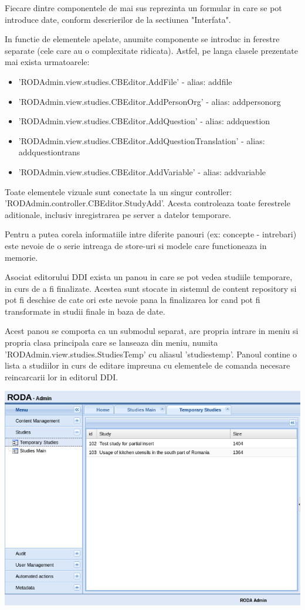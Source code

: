 Fiecare dintre componentele de mai sus reprezinta un formular in care se pot introduce date, conform descrierilor de la sectiunea "Interfata". 

In functie de elementele apelate, anumite componente se introduc in ferestre separate (cele care au o complexitate ridicata). Astfel, pe langa clasele prezentate mai exista urmatoarele: 

\begin{itemize}
\item 'RODAdmin.view.studies.CBEditor.AddFile' - alias: addfile
\item 'RODAdmin.view.studies.CBEditor.AddPersonOrg' - alias: addpersonorg
\item 'RODAdmin.view.studies.CBEditor.AddQuestion' - alias: addquestion
\item 'RODAdmin.view.studies.CBEditor.AddQuestionTranslation' - alias: addquestiontrans
\item 'RODAdmin.view.studies.CBEditor.AddVariable' - alias: addvariable
\end{itemize}


Toate elementele vizuale sunt conectate la un singur controller: 'RODAdmin.controller.CBEditor.StudyAdd'. Acesta controleaza toate ferestrele aditionale, inclusiv inregistrarea pe server a datelor temporare. 

Pentru a putea corela informatiile intre diferite panouri (ex: concepte - intrebari) este nevoie de o serie intreaga de store-uri si modele care functioneaza in memorie. 

Asociat editorului DDI exista un panou in care se pot vedea studiile temporare, in curs de a fi finalizate. Acestea sunt stocate in sistemul de content repository si pot fi deschise de cate ori este nevoie pana la finalizarea lor cand pot fi transformate in studii finale in baza de date. 

Acest panou se comporta ca un submodul separat, are propria intrare in meniu si propria clasa principala care se lanseaza din meniu, numita 'RODAdmin.view.studies.StudiesTemp' cu aliasul 'studiestemp'. Panoul contine o lista a studiilor in curs de editare impreuna cu elementele de comanda necesare reincarcarii lor in editorul DDI. 

\includegraphics[width=16cm]{img/temporarystudies}


